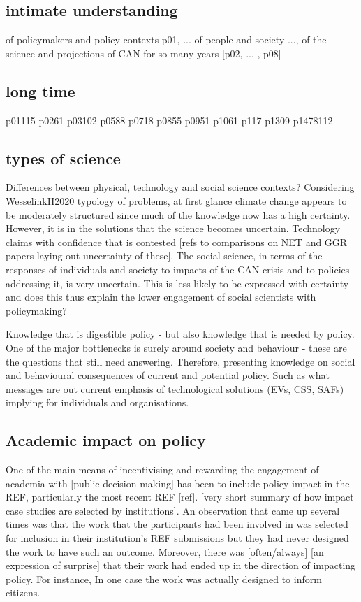 \subsection{intimate understanding}
of policymakers and policy contexts p01, ...
of people and society ..., of the science and projections of CAN for so many years [p02, ... , p08]
\subsection{long time} {p01}{115} {p02}{61} {p03}{102} {p05}{88} {p07}{18} {p08}{55} {p09}{51} {p10}{61} {p11}{7} {p13}{09} {p14}{78}{112}

\subsection{types of science}
Differences between physical, technology and social science contexts?
Considering WesselinkH2020 typology of problems, at first glance climate change appears to be moderately structured since much of the knowledge now has a high certainty. However, it is in the solutions that the science becomes uncertain. Technology claims with confidence that is contested [refs to comparisons on NET and GGR papers laying out uncertainty of these]. The social science, in terms of the responses of individuals and society to impacts of the CAN crisis and to policies addressing it, is very uncertain. This is less likely to be expressed with certainty and does this thus explain the lower engagement of social scientists with policymaking?

Knowledge that is digestible policy - but also knowledge that is needed by policy. One of the major bottlenecks is surely around society and behaviour - these are the questions that still need answering. Therefore, presenting knowledge on social and behavioural consequences of current and potential policy. Such as what messages are out current emphasis of technological solutions (EVs, CSS, SAFs) implying for individuals and organisations.

\subsection{Academic impact on policy}
One of the main means of incentivising and rewarding the engagement of academia with [public decision making] has been to include policy impact in the REF, particularly the most recent REF [ref]. [very short summary of how impact case studies are selected by institutions]. An observation that came up several times was that the work that the participants had been involved in was selected for inclusion in their institution's REF submissions but they had never designed the work to have such an outcome. Moreover, there was [often/always] [an expression of surprise] that their work had ended up in the direction of impacting policy. For instance, In one case the work was actually designed to inform citizens. 

